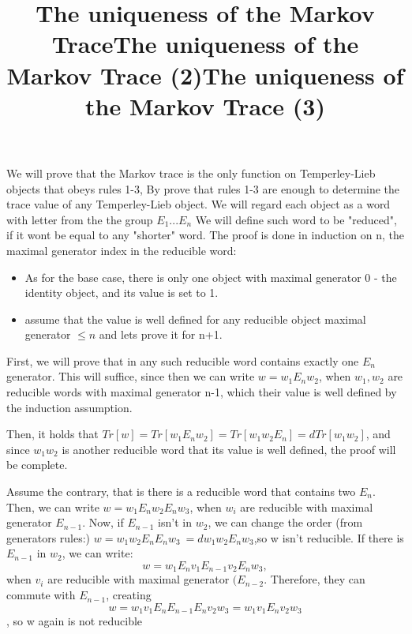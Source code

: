 \documentclass{article}
\begin{document}
\title{The uniqueness of the Markov Trace}
We will prove that the Markov trace is the only function on Temperley-Lieb objects that obeys rules 1-3,
By prove that rules 1-3 are enough to determine the trace value of any Temperley-Lieb object.
We will regard each object as a word with letter from the the group $E_{1}...E_{n}$
We will define such word to be "reduced", if it wont be equal to any "shorter" word.
The proof is done in induction on n, the maximal generator index in the reducible word:
\begin{itemize}
\item As for the base case, there is only one object with maximal generator 0 - the identity object, and its value is set to 1.
\item assume that the value is well defined for any reducible object maximal generator $\leq n$ and lets prove it for n+1. 
\end{itemize}


\title{The uniqueness of the Markov Trace (2)}
First, we will prove that in any such reducible word contains exactly one $E_{n}$ generator.
This will suffice, since then we can write $w=w_{1}E_{n}w_{2}$, when $w_{1}, w_{2}$ are
reducible words with maximal generator n-1, which their value is well defined by the induction assumption.

Then, it holds that $Tr[w]=Tr[w_{1}E_{n}w_{2}] = Tr[w_{1}w_{2}E_{n}] = dTr[w_{1}w_{2}]$, and
since $w_{1}w_{2}$ is another reducible word that its value is well defined, the proof will be complete.   


\title{The uniqueness of the Markov Trace (3)}
Assume the contrary, that is there is a reducible word that contains two $E_{n}$.
Then, we can write $w=w_{1}E_{n}w_{2}E_{n}w_{3}$, when $w_{i}$ are reducible with maximal generator
$E_{n-1}$. Now, if $E_{n-1}$ isn't in $w_{2}$, we can change the order (from generators rules:)
$w=w_{1}w_{2}E_{n}E_{n}w_{3}\ = dw_{1}w_{2}E_{n}w_{3}$,so w isn't reducible.
If there is $E_{n-1}$ in  $w_{2}$, we can write:
\begin{displaymath}
 w=w_{1}E_{n}v_{1}E_{n-1}v_{2}E_{n}w_{3},
 \end{displaymath} 
 when 
 $v_{i}$  are reducible with maximal generator
$(E_{n-2}$. Therefore, they can commute with $E_{n-1}$, creating 
\begin{displaymath}
w=w_{1}v_{1}E_{n}E_{n-1}E_{n}v_{2}w_{3}
= w_{1}v_{1}E_{n}v_{2}w_{3}
 \end{displaymath} 
 , so w again is not reducible
   
\end{document}
